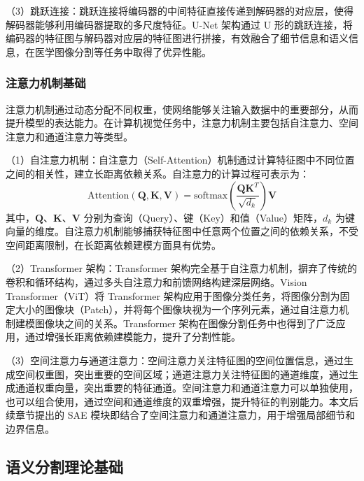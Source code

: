 （3）跳跃连接：跳跃连接将编码器的中间特征直接传递到解码器的对应层，使得解码器能够利用编码器提取的多尺度特征。U-Net 架构通过 U 形的跳跃连接，将编码器的特征图与解码器对应层的特征图进行拼接，有效融合了细节信息和语义信息，在医学图像分割等任务中取得了优异性能。

\subsubsection{注意力机制基础}

注意力机制通过动态分配不同权重，使网络能够关注输入数据中的重要部分，从而提升模型的表达能力。在计算机视觉任务中，注意力机制主要包括自注意力、空间注意力和通道注意力等类型。

（1）自注意力机制：自注意力（Self-Attention）机制通过计算特征图中不同位置之间的相关性，建立长距离依赖关系。自注意力的计算过程可表示为：
\begin{equation}
\text{Attention}(\mathbf{Q}, \mathbf{K}, \mathbf{V}) = \text{softmax}\left(\frac{\mathbf{Q}\mathbf{K}^T}{\sqrt{d_k}}\right)\mathbf{V}
\label{eq:self_attention}
\end{equation}
其中，$\mathbf{Q}$、$\mathbf{K}$、$\mathbf{V}$ 分别为查询（Query）、键（Key）和值（Value）矩阵，$d_k$ 为键向量的维度。自注意力机制能够捕获特征图中任意两个位置之间的依赖关系，不受空间距离限制，在长距离依赖建模方面具有优势。

（2）Transformer 架构：Transformer 架构完全基于自注意力机制，摒弃了传统的卷积和循环结构，通过多头自注意力和前馈网络构建深层网络。Vision Transformer（ViT）将 Transformer 架构应用于图像分类任务，将图像分割为固定大小的图像块（Patch），并将每个图像块视为一个序列元素，通过自注意力机制建模图像块之间的关系。Transformer 架构在图像分割任务中也得到了广泛应用，通过增强长距离依赖建模能力，提升了分割性能。

（3）空间注意力与通道注意力：空间注意力关注特征图的空间位置信息，通过生成空间权重图，突出重要的空间区域；通道注意力关注特征图的通道维度，通过生成通道权重向量，突出重要的特征通道。空间注意力和通道注意力可以单独使用，也可以组合使用，通过空间和通道维度的双重增强，提升特征的判别能力。本文后续章节提出的 SAE 模块即结合了空间注意力和通道注意力，用于增强局部细节和边界信息。

\subsection{语义分割理论基础}

